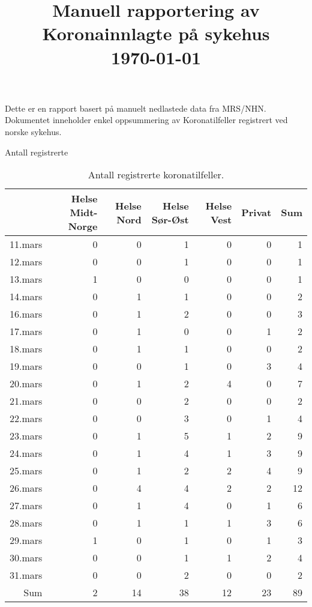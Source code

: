 \documentclass[handout, xcolor=pdftex,dvipsnames,table]{beamer}\usepackage[]{graphicx}\usepackage[]{color}
\begin{document}
\title[Koronadata]{Manuell rapportering av Koronainnlagte på sykehus \\\today}

\maketitle

Dette er en rapport basert på manuelt nedlastede data fra MRS/NHN.
Dokumentet inneholder enkel oppsummering av Koronatilfeller registrert ved norske sykehus.
\\


\begin{tiny}

\begin{frame}[fragile] {Antall registrerte}
\begin{table}[ht]
\centering
\begin{tabular}{rrrrrrr}
  \hline
 & Helse Midt-Norge & Helse Nord & Helse Sør-Øst & Helse Vest & Privat & Sum \\ 
  \hline
11.mars & 0 & 0 & 1 & 0 & 0 & 1 \\ 
  12.mars & 0 & 0 & 1 & 0 & 0 & 1 \\ 
  13.mars & 1 & 0 & 0 & 0 & 0 & 1 \\ 
  14.mars & 0 & 1 & 1 & 0 & 0 & 2 \\ 
  16.mars & 0 & 1 & 2 & 0 & 0 & 3 \\ 
  17.mars & 0 & 1 & 0 & 0 & 1 & 2 \\ 
  18.mars & 0 & 1 & 1 & 0 & 0 & 2 \\ 
  19.mars & 0 & 0 & 1 & 0 & 3 & 4 \\ 
  20.mars & 0 & 1 & 2 & 4 & 0 & 7 \\ 
  21.mars & 0 & 0 & 2 & 0 & 0 & 2 \\ 
  22.mars & 0 & 0 & 3 & 0 & 1 & 4 \\ 
  23.mars & 0 & 1 & 5 & 1 & 2 & 9 \\ 
  24.mars & 0 & 1 & 4 & 1 & 3 & 9 \\ 
  25.mars & 0 & 1 & 2 & 2 & 4 & 9 \\ 
  26.mars & 0 & 4 & 4 & 2 & 2 & 12 \\ 
  27.mars & 0 & 1 & 4 & 0 & 1 & 6 \\ 
  28.mars & 0 & 1 & 1 & 1 & 3 & 6 \\ 
  29.mars & 1 & 0 & 1 & 0 & 1 & 3 \\ 
  30.mars & 0 & 0 & 1 & 1 & 2 & 4 \\ 
  31.mars & 0 & 0 & 2 & 0 & 0 & 2 \\ 
  Sum & 2 & 14 & 38 & 12 & 23 & 89 \\ 
   \hline
\end{tabular}
\caption{Antall registrerte koronatilfeller.} 
\end{table}



\end{frame}
\end{tiny}
\end{document}
